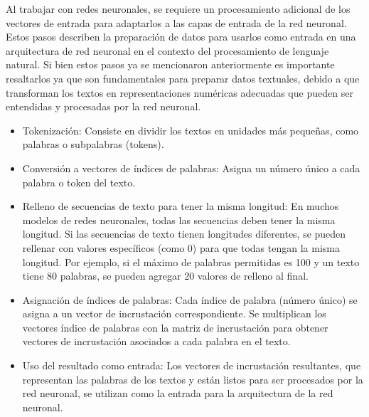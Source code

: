 Al trabajar con redes neuronales, se requiere un procesamiento adicional de los vectores de entrada para adaptarlos a las capas de entrada de la red neuronal. Estos pasos describen la preparación de datos para usarlos como entrada en una arquitectura de red neuronal en el contexto del procesamiento de lenguaje natural. Si bien estos pasos ya se mencionaron anteriormente es importante resaltarlos ya que son fundamentales para preparar datos textuales, debido a que transforman los textos en representaciones numéricas adecuadas que pueden ser entendidas y procesadas por la red neuronal.

\begin{itemize}

	\item Tokenización: Consiste en dividir los textos en unidades más pequeñas, como palabras o subpalabras (tokens).
	
	\item Conversión a vectores de índices de palabras: Asigna un número único a cada palabra o token del texto.

	\item Relleno de secuencias de texto para tener la misma longitud: En muchos modelos de redes neuronales, todas las secuencias deben tener la misma longitud. Si las secuencias de texto tienen longitudes diferentes, se pueden rellenar con valores específicos (como 0) para que todas tengan la misma longitud. Por ejemplo, si el máximo de palabras permitidas es 100 y un texto tiene 80 palabras, se pueden agregar 20 valores de relleno al final.
	
	\item Asignación de índices de palabras: Cada índice de palabra (número único) se asigna a un vector de incrustación correspondiente. Se multiplican los vectores índice de palabras con la matriz de incrustación para obtener vectores de incrustación asociados a cada palabra en el texto.
	
	\item Uso del resultado como entrada: Los vectores de incrustación resultantes, que representan las palabras de los textos y están listos para ser procesados por la red neuronal, se utilizan como la entrada para la arquitectura de la red neuronal.

\end{itemize}
